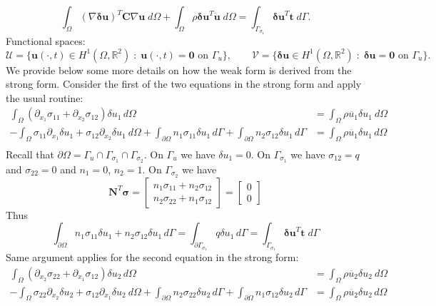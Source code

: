 \documentclass[12pt]{article}
\begin{document}
\[
	\int_{\Omega} (\nabla \boldsymbol{\delta u})^T \mathbf{C} \nabla \mathbf{u}\;d\Omega
	+ \int_{\Omega} \rho \boldsymbol{\delta u}^T \ddot{\mathbf{u}} \; d\Omega
	= \int_{\Gamma_{\sigma_1}} \boldsymbol{\delta u}^T \mathbf{t} \; d\Gamma.
\]
Functional spaces:
\[
	\mathcal{U} = \{ \mathbf{u}(\cdot,t) \in H^1(\Omega,\mathbb R^2) \;:\; \mathbf{u}(\cdot,t) = \mathbf{0} \text{ on } \Gamma_u \}, \qquad
	\mathcal{V} = \{ \boldsymbol{\delta u} \in H^1(\Omega,\mathbb R^2) \;:\; \boldsymbol{\delta u} = \mathbf{0} \text{ on } \Gamma_u \}.
\]
We provide below some more details on how the weak form is derived from the strong form. Consider the first of the two equations in the strong form and apply the usual routine:
\begin{align*}
	\int_\Omega(\partial_{x_1}\sigma_{11} + \partial_{x_2}\sigma_{12})\delta u_1\, d\Omega                                                                                                                             & = \int_\Omega\rho \ddot{u_{1}}\delta u_1\ d\Omega  \\
	-\int_\Omega\sigma_{11}\partial_{x_1}\delta u_1 +\sigma_{12} \partial_{x_2}\delta u_1\ d\Omega + \int_{\partial\Omega}n_1\sigma_{11}\delta u_1\, d\Gamma + \int_{\partial\Omega}n_2\sigma_{12}\delta u_1\, d\Gamma & = \int_\Omega\rho \ddot{u_{1}}\delta u_1\, d\Omega \\
\end{align*}
Recall that $\partial\Omega=\Gamma_u\cap\Gamma_{\sigma_1}\cap \Gamma_{\sigma_2}$. On $\Gamma_u$ we have $\delta u_1=0$. On $\Gamma_{\sigma_1}$  we have $\sigma_{12}=q$ and $\sigma_{22}=0$ and $n_1=0$, $n_2=1$. On $\Gamma_{\sigma_2}$  we have
$$\mathbf{N}^T\boldsymbol{\sigma}=\begin{bmatrix}n_1\sigma_{11}+n_2\sigma_{12} \\n_2\sigma_{22}+n_1\sigma_{12} \end{bmatrix}=\begin{bmatrix}
		0 \\ 0
	\end{bmatrix}$$
Thus
$$\int_{\partial\Omega}n_1\sigma_{11}\delta u_1+n_2\sigma_{12}\delta u_1\, d\Gamma = \int_{\partial\Gamma_{\sigma_1}}q\delta u_1 \, d\Gamma = \int_{\Gamma_{\sigma_1}} \boldsymbol{\delta u}^T \mathbf{t} \; d\Gamma$$
Same argument applies for the second equation in the strong form:
\begin{align*}
	\int_\Omega(\partial_{x_2}\sigma_{22} + \partial_{x_1}\sigma_{12})\delta u_2\, d\Omega                                                                                                                             & = \int_\Omega\rho \ddot{u_{2}}\delta u_2\ d\Omega  \\
	-\int_\Omega\sigma_{22}\partial_{x_2}\delta u_2 +\sigma_{12} \partial_{x_1}\delta u_2\ d\Omega + \int_{\partial\Omega}n_2\sigma_{22}\delta u_2\, d\Gamma + \int_{\partial\Omega}n_1\sigma_{12}\delta u_2\, d\Gamma & = \int_\Omega\rho \ddot{u_{2}}\delta u_2\, d\Omega \\
\end{align*}
\end{document}
